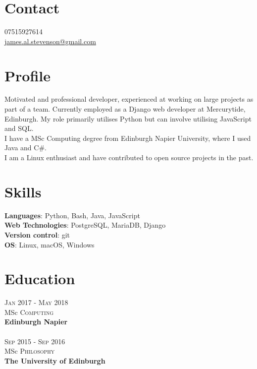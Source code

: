 \documentclass[14pt, a4paper]{extarticle}
\begin{document}
\par{\bigskip\par
\section{Contact}
\large
07515927614\\
\href{mailto:james.al.stevenson@gmail.com}{james.al.stevenson@gmail.com}\\
}

\begin{multicols}{2}

\section{Profile}
\noindent Motivated and professional developer, experienced at working on large projects as part of a team. Currently employed as a Django web developer at Mercurytide, Edinburgh. My role primarily utilises Python but can involve utilising JavaScript and SQL.\\
I have a MSc Computing degree from Edinburgh Napier University, where I used Java and C\#.\\
I am a Linux enthusiast and have contributed to open source projects in the past.

\section{Skills}
\noindent\textbf{Languages}: Python, Bash, Java, JavaScript\\
\textbf{Web Technologies}: PostgreSQL, MariaDB, Django\\
\textbf{Version control}: git\\
\textbf{OS}: Linux, macOS, Windows

\section{Education}
\noindent\textsc{Jan} 2017 - \textsc{May} 2018\\
MSc \textsc{Computing} \\
\textbf{Edinburgh Napier}\\~\\
\textsc{Sep} 2015 - \textsc{Sep} 2016\\
MSc \textsc{Philosophy} \\ 
\textbf{The University of Edinburgh}


\end{multicols}
\end{document}
